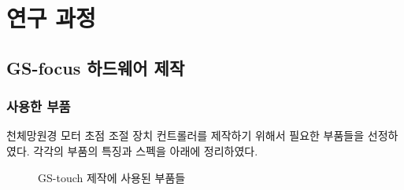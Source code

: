 \section{연구 과정}

\subsection{GS-focus 하드웨어 제작}

\subsubsection{사용한 부품}


천체망원경 모터 초점 조절 장치 컨트롤러를 제작하기 위해서 필요한 부품들을 선정하였다. 각각의 부품의 특징과 스펙을 아래에 정리하였다. 
\begin{figure}[h]
	\caption{GS-touch 제작에 사용된 부품들}
	\label{fig:parts}
\end{figure}

